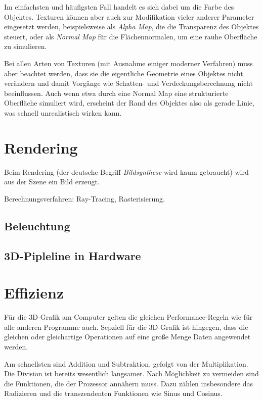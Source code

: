 
Im einfachsten und häufigsten Fall handelt es sich dabei um die Farbe des Objektes. Texturen können aber auch zur Modifikation vieler anderer Parameter eingesetzt werden, beispielsweise als \emph{Alpha Map}, die die Transparenz des Objektes steuert, oder als \emph{Normal Map} für die Flächennormalen, um eine rauhe Oberfläche zu simulieren.

Bei allen Arten von Texturen (mit Ausnahme einiger moderner Verfahren) muss aber beachtet werden, dass sie die eigentliche Geometrie eines Objektes nicht verändern und damit Vorgänge wie Schatten- und Verdeckungsberechnung nicht beeinflussen. Auch wenn etwa durch eine Normal Map eine strukturierte Oberfläche simuliert wird, erscheint der Rand des Objektes also als gerade Linie, was schnell unrealistisch wirken kann.

\section{Rendering}
\label{rendering}
Beim Rendering (der deutsche Begriff \emph{Bildsynthese} wird kaum gebraucht) wird aus der Szene ein Bild erzeugt.

Berechnungsverfahren: Ray-Tracing, Rasterisierung.

\subsection{Beleuchtung}
\label{lighting}

\subsection{3D-Pipleline in Hardware}
\label{direct3dopengl}

\section{Effizienz}
\label{performance}
Für die 3D-Grafik am Computer gelten die gleichen Performance-Regeln wie für alle anderen Programme auch. Sepziell für die 3D-Grafik ist hingegen, dass die gleichen oder gleichartige Operationen auf eine große Menge Daten angewendet werden.

Am schnellsten sind Addition und Subtraktion, gefolgt von der Multiplikation. Die Division ist bereits wesentlich langsamer. Nach Möglichkeit zu vermeiden sind die Funktionen, die der Prozessor annähern muss. Dazu zählen insbesondere das Radizieren und die transzendenten Funktionen wie Sinus und Cosinus.

